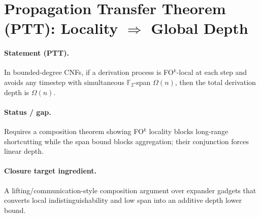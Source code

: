 \section{Propagation Transfer Theorem (PTT): Locality $\Rightarrow$ Global Depth}

\paragraph{Statement (PTT).}
In bounded-degree CNFs, if a derivation process is FO$^k$-local at each step and avoids any timestep
with simultaneous $\mathbb F_2$-span $\Omega(n)$, then the total derivation depth is $\Omega(n)$.

\paragraph{Status / gap.}
Requires a composition theorem showing FO$^k$ locality blocks long-range shortcutting while the span bound
blocks aggregation; their conjunction forces linear depth.

\paragraph{Closure target ingredient.}
A lifting/communication-style composition argument over expander gadgets that converts local indistinguishability
and low span into an additive depth lower bound.
